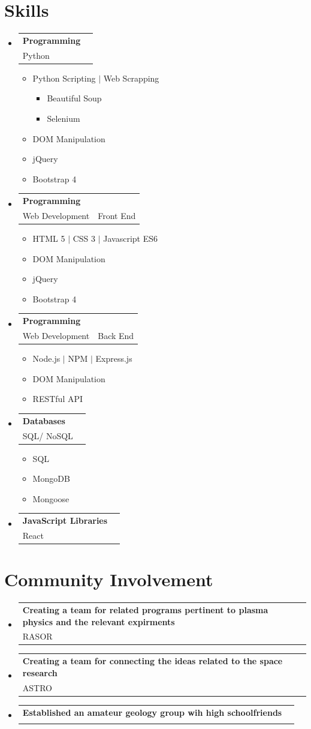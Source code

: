 \documentclass[A4,11pt]{article}
\makeatletter
\newcommand{\CVItem}[1]{
  \item\small{
    {#1 \vspace{-2pt}}
  }
}
\newcommand{\CVSubheading}[4]{
  \vspace{-2pt}\item
    \begin{tabular*}{0.97\textwidth}[t]{l@{\extracolsep{\fill}}r}
      \textbf{#1} & #2 \\
      \small#3 & \small #4 \\
    \end{tabular*}\vspace{-7pt}
}
\newcommand{\CVSubHeadingListStart}{\begin{itemize}[leftmargin=0.5cm, label={}]}
\newcommand{\CVSubHeadingListEnd}{\end{itemize}}
\newcommand{\CVItemListStart}{\begin{itemize}}
\newcommand{\CVItemListEnd}{\end{itemize}\vspace{-5pt}}
\makeatother
\begin{document}
\section{Skills}
   \CVSubHeadingListStart
   
   \CVSubheading
     {Programming}{}
     {Python}{}
      \CVItemListStart
        \CVItem{Python Scripting $|$ Web Scrapping }
        \CVItemListStart
          \CVItem{Beautiful Soup}
          \CVItem{Selenium}
         \CVItemListEnd
          
        \CVItem{DOM Manipulation}
        \CVItem{jQuery}
        \CVItem{Bootstrap 4}
        \CVItemListEnd
   
   
     \CVSubheading
     {Programming}{}
     {Web Development}{Front End}
      \CVItemListStart
        \CVItem{HTML 5 $|$ CSS 3 $|$ Javascript ES6}
        \CVItem{DOM Manipulation}
        \CVItem{jQuery}
        \CVItem{Bootstrap 4}
        \CVItemListEnd
        
     \CVSubheading
     {Programming}{}
     {Web Development}{Back End}
      \CVItemListStart
        \CVItem{Node.js $|$ NPM $|$ Express.js}
        \CVItem{DOM Manipulation}
        \CVItem{RESTful API}
         \CVItemListEnd
         
     \CVSubheading
     {Databases }{}
     {SQL/ NoSQL}{}
      \CVItemListStart
        \CVItem{SQL}
        \CVItem{MongoDB}
        \CVItem{Mongoose}
         \CVItemListEnd
         
     \CVSubheading
     {JavaScript Libraries}{}
     {React}{}
     \CVSubHeadingListEnd










     
    
\section{Community Involvement}
  \CVSubHeadingListStart
    \CVSubheading
      {Creating a team for related programs pertinent to plasma physics and the relevant expirments}{}
      {RASOR}{}
    \CVSubheading
      {Creating a team for connecting the ideas related to the space research}{}
      {ASTRO}{}
    \CVSubheading
      {Established an amateur geology group wih high schoolfriends}{}
      {}{}
  \CVSubHeadingListEnd
\end{document}
